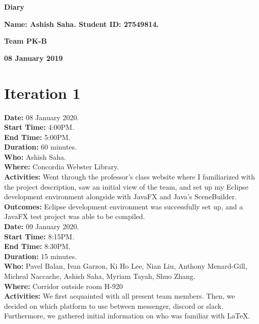 \documentclass[12pt]{article}
\begin{document}
\vspace*{0.2in}
\centerline{\bf\Large Diary}

\vspace*{0.2in}
\centerline{\bf\Large Name: Ashish Saha.  Student ID: 27549814.}

\vspace*{0.2in}
\centerline{\bf\Large Team PK-B}

\vspace*{0.2in}
\centerline{\bf\Large 08 January 2019}

\section{Iteration 1}

{\bf Date:} 08 January 2020. \\
{\bf Start Time:} 4:00PM. \\
{\bf End Time:} 5:00PM. \\
{\bf Duration:} 60 minutes. \\
{\bf Who:} Ashish Saha. \\
{\bf Where:} Concordia Webster Library. \\
{\bf Activities:} Went through the professor's class website where I familiarized with the project description, saw an initial view of the team, and set up my Eclipse development environment alongside with JavaFX and Java's SceneBuilder.  \\
{\bf Outcomes:} Eclipse development environment was successfully set up, and a JavaFX test project was able to be compiled.
\vspace*{0.2in} \\
{\bf Date:} 09 January 2020. \\
{\bf Start Time:} 8:15PM. \\
{\bf End Time:} 8:30PM. \\
{\bf Duration:} 15 minutes. \\
{\bf Who:} Pavel Balan, Ivan Garzon, Ki Ho Lee, Nian Liu, Anthony Menard-Gill, \\
\hspace{10mm} Micheal Naccache, Ashish Saha, Myriam Tayah, Shuo Zhang. \\
{\bf Where:} Corridor outside room H-920 \\
{\bf Activities:} We first acquainted with all present team members. Then, we decided on which platform to use between messenger, discord or slack. Furthermore, we gathered initial information on who was familiar with LaTeX. \\
\end{document}
